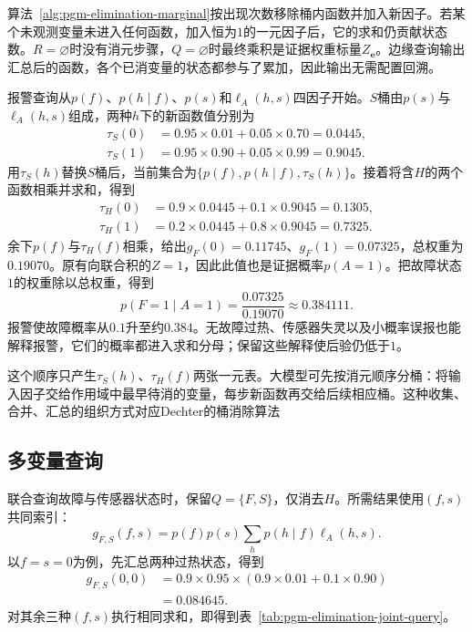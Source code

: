 算法~\ref{alg:pgm-elimination-marginal}按出现次数移除桶内函数并加入新因子。若某个未观测变量未进入任何函数，加入恒为$1$的一元因子后，它的求和仍贡献状态数。$R=\varnothing$时没有消元步骤，$Q=\varnothing$时最终乘积是证据权重标量$Z_{\bm{e}}$。边缘查询输出汇总后的函数，各个已消变量的状态都参与了累加，因此输出无需配置回溯。

报警查询从$p(f)$、$p(h\mid f)$、$p(s)$和$\ell_A(h,s)$四因子开始。$S$桶由$p(s)$与$\ell_A(h,s)$组成，两种$h$下的新函数值分别为
\begin{equation}
  \begin{aligned}
    \tau_S(0)&=0.95\times0.01+0.05\times0.70=0.0445,\\
    \tau_S(1)&=0.95\times0.90+0.05\times0.99=0.9045.
  \end{aligned}
  \label{eq:pgm-elimination-alarm-s}
\end{equation}
用$\tau_S(h)$替换$S$桶后，当前集合为$\{p(f),p(h\mid f),\tau_S(h)\}$。接着将含$H$的两个函数相乘并求和，得到
\begin{equation}
  \begin{aligned}
    \tau_H(0)&=0.9\times0.0445+0.1\times0.9045=0.1305,\\
    \tau_H(1)&=0.2\times0.0445+0.8\times0.9045=0.7325.
  \end{aligned}
  \label{eq:pgm-elimination-alarm-h}
\end{equation}
余下$p(f)$与$\tau_H(f)$相乘，给出$g_F(0)=0.11745$、$g_F(1)=0.07325$，总权重为$0.19070$。原有向联合积的$Z=1$，因此此值也是证据概率$p(A=1)$。把故障状态$1$的权重除以总权重，得到
\begin{equation}
  p(F=1\mid A=1)
  =\frac{0.07325}{0.19070}
  \approx0.384111.
  \label{eq:pgm-elimination-alarm-posterior}
\end{equation}
报警使故障概率从$0.1$升至约$0.384$。无故障过热、传感器失灵以及小概率误报也能解释报警，它们的概率都进入求和分母；保留这些解释使后验仍低于$1$。

这个顺序只产生$\tau_S(h)$、$\tau_H(f)$两张一元表。大模型可先按消元顺序分桶：将输入因子交给作用域中最早待消的变量，每步新函数再交给后续相应桶。这种收集、合并、汇总的组织方式对应Dechter的桶消除算法

\subsection{多变量查询}
\label{sec:pgm-elimination-multivariate-query}

联合查询故障与传感器状态时，保留$Q=\{F,S\}$，仅消去$H$。所需结果使用$(f,s)$共同索引：
\begin{equation}
  g_{F,S}(f,s)
  =p(f)p(s)\sum_h p(h\mid f)\ell_A(h,s).
  \label{eq:pgm-elimination-joint-query}
\end{equation}
以$f=s=0$为例，先汇总两种过热状态，得到
\[
  \begin{aligned}
    g_{F,S}(0,0)
    &=0.9\times0.95\times(0.9\times0.01+0.1\times0.90)\\
    &=0.084645.
  \end{aligned}
\]
对其余三种$(f,s)$执行相同求和，即得到表~\ref{tab:pgm-elimination-joint-query}。

